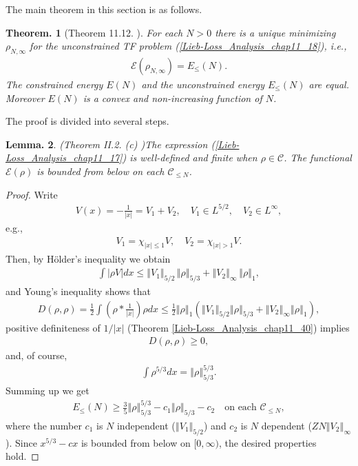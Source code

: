 \documentclass[openany, a4paper, oneside]{jsbook}
\theoremstyle{break}
\theoremstyle{breakdefn}
\newtheorem{thm}{Theorem.}[section]
\newtheorem{lem}[thm]{Lemma.}
\newcommand{\abs}[1]{\left|#1\right|}
\newcommand{\norm}[1]{\left\Vert#1\right\Vert}
\newcommand{\rbk}[1]{\left (#1\right)}
\newcommand{\calC}{\mathcal{C}}
\newcommand{\calE}{\mathcal{E}}
\newcommand{\EleqN}{E_{\leq}(N)}
\newcommand{\rhoNinfty}{\rho_{N, \infty}}
\begin{document}
The main theorem in this section is as follows.
\begin{thm}[Theorem 11.12. \cite{LiebLoss1}]\label{Lieb-Loss_Analysis_chap11_33}
 For each $N > 0$ there is a unique minimizing $\rhoNinfty$ for the unconstrained TF problem (\ref{Lieb-Loss_Analysis_chap11_18}), i.e.,
 \begin{align}
  \calE \rbk{\rhoNinfty}
  =
  E_{\leq} (N).
 \end{align}
 The constrained energy $E (N)$ and the unconstrained energy $E_{\leq} (N)$ are equal.
 Moreover $E (N)$ is a convex and non-increasing function of $N$.
\end{thm}
The proof is divided into several steps.
\begin{lem}\textup{(Theorem II.2. (c) \cite{LiebSimon1})}\label{Lieb-Loss_Analysis_chap11_19}
 The expression \textup{(\ref{Lieb-Loss_Analysis_chap11_17})} is well-defined and finite when $\rho \in \calC$.
 The functional $\calE \rbk{\rho}$ is bounded from below on each $\calC_{\leq N}$.
\end{lem}
\begin{proof}
Write
\begin{align}
 V (x)
 =
 -\frac{1}{\abs{x}}
 =
 V_1 + V_2, \quad V_1 \in L^{5/2}, \quad V_2 \in L^{\infty},
\end{align}
e.g.,
\begin{align}
 V_1 = \chi_{\abs{x} \leq 1} V, \quad
 V_2 = \chi_{\abs{x} > 1} V.
\end{align}
Then, by H\"older's inequality we obtain
\begin{align}
 \int \abs{\rho V} dx
 \leq
 \norm{V_1}_{5/2} \, \norm{\rho}_{5/3} + \norm{V_2}_{\infty} \, \norm{\rho}_1,
\end{align}
and Young's inequality shows that
\begin{align}
 D (\rho, \rho)
 =
 \frac{1}{2} \int \rbk{\rho * \frac{1}{\abs{x}}} \rho dx
 \leq
 \frac{1}{2} \norm{\rho}_1 \rbk{\norm{V_1}_{5/2} \norm{\rho}_{5/3} + \norm{V_2}_{\infty} \norm{\rho}_1},
\end{align}
positive definiteness of $1/\abs{x}$ (Theorem \ref{Lieb-Loss_Analysis_chap11_40}) implies
\begin{align}
 D (\rho, \rho)
 \geq 0,
\end{align}
and, of course,
\begin{align}
 \int \rho^{5/3} dx
 =
 \norm{\rho}_{5/3}^{5/3}.
\end{align}
Summing up we get
\begin{align}
 \EleqN
 \geq
 \frac{3}{5} \norm{\rho}_{5/3}^{5/3} - c_1 \norm{\rho}_{5/3} - c_2 \quad \text{on each } \calC_{\leq N}, \label{Lieb-Loss_Analysis_chap11_21}
\end{align}
where the number $c_1$ is $N$ independent ($\norm{V_1}_{5/2}$) and $c_2$ is $N$ dependent ($ZN \norm{V_2}_{\infty}$).
Since $x^{5/3} - c x$ is bounded from below on $[0, \infty)$, the desired properties hold.
\end{proof}
\end{document}
